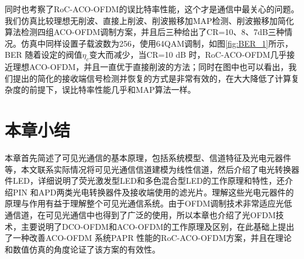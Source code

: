 同时也考察了RoC-ACO-OFDM的误比特率性能，这个才是通信中最关心的问题。我们仿真比较理想无削波、直接上削波、削波搬移加MAP检测、削波搬移加简化算法检测四组ACO-OFDM调制方案，并且后三种给出了CR=10、8、7dB三种情况。仿真中同样设置子载波数为256，使用64QAM调制，如图\ref{fig:BER_1}所示，BER 随着设定的阀值$\eta_c$变大而减少，当CR=10 dB 时，RoC-ACO-OFDM几乎接近理想ACO-OFDM，并且一直优于直接削波的方法；同时在图中也可以看出，我们提出的简化的接收端信号检测并恢复的方式是非常有效的，在大大降低了计算复杂度的前提下，误比特率性能几乎和MAP算法一样。
\section{本章小结}
本章首先简述了可见光通信的基本原理，包括系统模型、信道特征及光电元器件等，本文联系实际情况将可见光通信信道建模为线性信道，然后介绍了电光转换器件LED，详细说明了荧光激发型LED和多色混合型LED的工作原理和特性，还介绍PIN 和APD两类光电转换器件及接收端使用的滤光片。理解这些光电元器件的原理与作用有益于理解整个可见光通信系统。由于OFDM调制技术非常适应光低通信道，在可见光通信中也得到了广泛的使用，所以本章也介绍了光OFDM技术，主要说明了DCO-OFDM和ACO-OFDM的工作原理及区别，在此基础上提出了一种改善ACO-OFDM 系统PAPR 性能的RoC-ACO-OFDM方案，并且在理论和数值仿真的角度论证了该方案的有效性。
